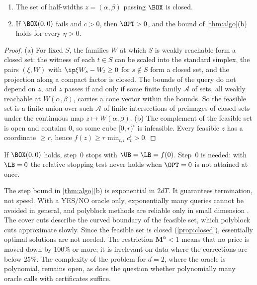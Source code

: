 \begin{proposition}[closedness]\label{prop:closed}
\leavevmode
\begin{enumerate}[label=(\alph*)]
\item The set of half-widths $z=(\alpha,\beta)$ passing $\BOX$ is closed.
\item If $\BOX(0,0)$ fails and $c>0$, then $\OPT>0$, and the bound of \cref{thm:algo}(b) holds for every $\eta>0$.
\end{enumerate}
\end{proposition}
\begin{proof}
(a) For fixed $S$, the families $W$ at which $S$ is weakly reachable form a closed set: the witness of each $t\in S$ can be scaled into the standard simplex, the pairs $(\xi,W)$ with $\ip\xi{W_s-W_t}\ge0$ for $s\notin S$ form a closed set, and the projection along a compact factor is closed. The bounds of the query do not depend on $z$, and $z$ passes if and only if some finite family $\mathcal A$ of sets, all weakly reachable at $W(\alpha,\beta)$, carries a cone vector within the bounds. So the feasible set is a finite union over such $\mathcal A$ of finite intersections of preimages of closed sets under the continuous map $z\mapsto W(\alpha,\beta)$. (b) The complement of the feasible set is open and contains $0$, so some cube $[0,r)^\iota$ is infeasible. Every feasible $z$ has a coordinate $\ge r$, hence $f(z)\ge r\min_{t,i}c^i_t>0$.
\end{proof}
If $\BOX(0,0)$ holds, step~0 stops with $\UB=\LB=f(0)$. Step~0 is needed: with $\LB=0$ the relative stopping test never holds when $\OPT=0$ is not attained at once.

\begin{remark}
The step bound in \cref{thm:algo}(b) is exponential in $2dT$. It guarantees termination, not speed. With a YES/NO oracle only, exponentially many queries cannot be avoided in general, and polyblock methods are reliable only in small dimension \citep{TuyAlKhayyalThach2005}. The cover cuts describe the curved boundary of the feasible set, which polyblock cuts approximate slowly. Since the feasible set is closed (\cref{prop:closed}), essentially optimal solutions \citep{Tuy2005} are not needed. The restriction $\mathbf M^\alpha<1$ means that no price is moved down by $100\%$ or more; it is irrelevant on data where the corrections are below $25\%$. The complexity of the problem for $d=2$, where the oracle is polynomial, remains open, as does the question whether polynomially many oracle calls with certificates suffice.
\end{remark}
